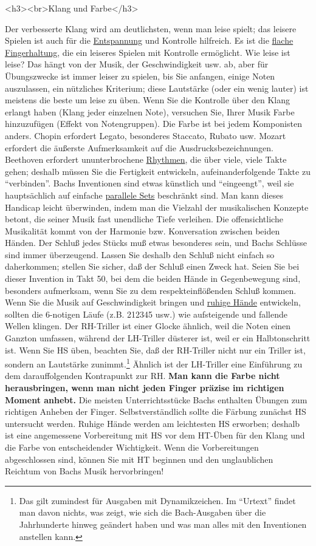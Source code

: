 <h3><br>Klang und Farbe</h3>

Der verbesserte Klang wird am deutlichsten, wenn man leise spielt; das leisere Spielen ist auch für die \hyperref[c1ii14]{Entspannung} und Kontrolle hilfreich.
Es ist die \hyperref[c1iii4b]{flache Fingerhaltung}, die ein leiseres Spielen mit Kontrolle ermöglicht.
Wie leise ist leise?
Das hängt von der Musik, der Geschwindigkeit usw. ab, aber für Übungszwecke ist immer leiser zu spielen, bis Sie anfangen, einige Noten auszulassen, ein nützliches Kriterium; diese Lautstärke (oder ein wenig lauter) ist meistens die beste um leise zu üben.
Wenn Sie die Kontrolle über den Klang erlangt haben (Klang jeder einzelnen Note), versuchen Sie, Ihrer Musik Farbe hinzuzufügen (Effekt von Notengruppen).
Die Farbe ist bei jedem Komponisten anders.
Chopin erfordert Legato, besonderes Staccato, Rubato usw.
Mozart erfordert die äußerste Aufmerksamkeit auf die Ausdrucksbezeichnungen.
Beethoven erfordert ununterbrochene \hyperref[c1iii1b]{Rhythmen}, die über viele, viele Takte gehen; deshalb müssen Sie die Fertigkeit entwickeln, aufeinanderfolgende Takte zu \enquote{verbinden}.
Bachs Inventionen sind etwas künstlich und \enquote{eingeengt}, weil sie hauptsächlich auf einfache \hyperref[c1iii7b]{parallele Sets} beschränkt sind.
Man kann dieses Handicap leicht überwinden, indem man die Vielzahl der musikalischen Konzepte betont, die seiner Musik fast unendliche Tiefe verleihen.
Die offensichtliche Musikalität kommt von der Harmonie bzw. Konversation zwischen beiden Händen.
Der Schluß jedes Stücks muß etwas besonderes sein, und Bachs Schlüsse sind immer überzeugend.
Lassen Sie deshalb den Schluß nicht einfach so daherkommen; stellen Sie sicher, daß der Schluß einen Zweck hat.
Seien Sie bei dieser Invention in Takt 50, bei dem die beiden Hände in Gegenbewegung sind, besonders aufmerksam, wenn Sie zu dem respekteinflößenden Schluß kommen.
Wenn Sie die Musik auf Geschwindigkeit bringen und \hyperref[ruhig]{ruhige Hände} entwickeln, sollten die 6-notigen Läufe (z.B. 212345 usw.) wie aufsteigende und fallende Wellen klingen.
Der RH-Triller ist einer Glocke ähnlich, weil die Noten einen Ganzton umfassen, während der LH-Triller düsterer ist, weil er ein Halbtonschritt ist.
Wenn Sie HS üben, beachten Sie, daß der RH-Triller nicht nur ein Triller ist, sondern an Lautstärke zunimmt.\footnote{Das gilt zumindest für Ausgaben mit Dynamikzeichen. Im \enquote{Urtext} findet man davon nichts, was zeigt, wie sich die Bach-Ausgaben über die Jahrhunderte hinweg geändert haben und was man alles mit den Inventionen anstellen kann.}
Ähnlich ist der LH-Triller eine Einführung zu dem darauffolgenden Kontrapunkt zur RH.
\textbf{Man kann die Farbe nicht herausbringen, wenn man nicht jeden Finger präzise im richtigen Moment anhebt.}
Die meisten Unterrichtsstücke Bachs enthalten Übungen zum richtigen Anheben der Finger.
Selbstverständlich sollte die Färbung zunächst HS untersucht werden.
Ruhige Hände werden am leichtesten HS erworben; deshalb ist eine angemessene Vorbereitung mit HS vor dem HT-Üben für den Klang und die Farbe von entscheidender Wichtigkeit.
Wenn die Vorbereitungen abgeschlossen sind, können Sie mit HT beginnen und den unglaublichen Reichtum von Bachs Musik hervorbringen!

